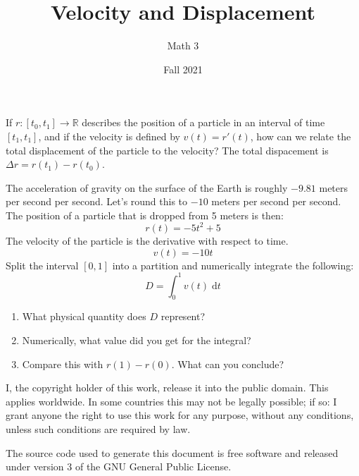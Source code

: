 \documentclass{article}
\title{Velocity and Displacement}
\author{Math 3}
\date{Fall 2021}
\theoremstyle{normal}
\theoremstyle{plain}
\begin{document}
    \maketitle
    If $r:[t_{0},t_{1}]\rightarrow\mathbb{R}$ describes the position of a
    particle in an interval of time $[t_{1},t_{1}]$, and if the velocity is
    defined by $v(t)=r'(t)$, how can we relate the total displacement of the
    particle to the velocity? The total dispacement is
    $\Delta{r}=r(t_{1})-r(t_{0})$.
    \par\hfill\par
    The acceleration of gravity on the surface of the Earth is roughly
    $-9.81$ meters per second per second. Let's round this to $-10$ meters per
    second per second. The position of a particle that is dropped from 5
    meters is then:
    \begin{equation}
        r(t)=-5t^{2}+5
    \end{equation}
    The velocity of the particle is the derivative with respect to time.
    \begin{equation}
        v(t)=-10t
    \end{equation}
    Split the interval $[0,1]$ into a partition and numerically integrate
    the following:
    \begin{equation}
        D=\int_{0}^{1}v(t)\;\textrm{d}t
    \end{equation}
    \begin{enumerate}
        \item
        What physical quantity does $D$ represent?
        \item
        Numerically, what value did you get for the integral?
        \item
        Compare this with $r(1)-r(0)$. What can you conclude?
    \end{enumerate}
    \newpage
    I, the copyright holder of this work, release it into the public domain.
    This applies worldwide. In some countries this may not be legally possible;
    if so: I grant anyone the right to use this work for any purpose, without
    any conditions, unless such conditions are required by law.
    \par\hfill\par
    The source code used to generate this document is free software and released
    under version 3 of the GNU General Public License.
\end{document}
